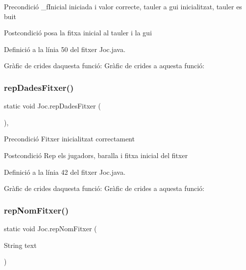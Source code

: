 \begin{DoxyPrecond}{Precondició}
\+\_\+f\+Inicial iniciada i valor correcte, tauler a gui inicialitzat, tauler es buit 
\end{DoxyPrecond}
\begin{DoxyPostcond}{Postcondició}
posa la fitxa inicial al tauler i la gui 
\end{DoxyPostcond}


Definició a la línia 50 del fitxer Joc.\+java.

Gràfic de crides d\textquotesingle{}aquesta funció\+:
Gràfic de crides a aquesta funció\+:
\mbox{\label{class_joc_afc0eb31677985cd98be8ed2debc31efa}} 
\subsubsection{\texorpdfstring{rep\+Dades\+Fitxer()}{repDadesFitxer()}}
{\footnotesize\ttfamily static void Joc.\+rep\+Dades\+Fitxer (\begin{DoxyParamCaption}{ }\end{DoxyParamCaption})\hspace{0.3cm}{\ttfamily [static]}, {\ttfamily [private]}}

\begin{DoxyPrecond}{Precondició}
Fitxer inicialitzat correctament 
\end{DoxyPrecond}
\begin{DoxyPostcond}{Postcondició}
Rep els jugadors, baralla i fitxa inicial del fitxer 
\end{DoxyPostcond}


Definició a la línia 42 del fitxer Joc.\+java.

Gràfic de crides d\textquotesingle{}aquesta funció\+:
Gràfic de crides a aquesta funció\+:
\mbox{\label{class_joc_aa164cac0c602f63ff7e8860db7d06649}} 
\subsubsection{\texorpdfstring{rep\+Nom\+Fitxer()}{repNomFitxer()}}
{\footnotesize\ttfamily static void Joc.\+rep\+Nom\+Fitxer (\begin{DoxyParamCaption}\item[{String}]{text }\end{DoxyParamCaption})\hspace{0.3cm}{\ttfamily [static]}}

